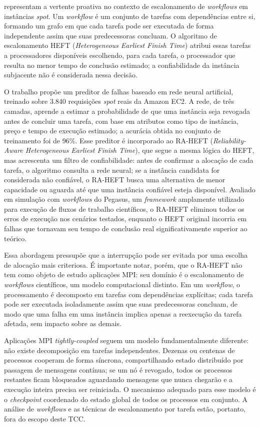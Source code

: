  representam a vertente proativa no
contexto de escalonamento de \textit{workflows} em instâncias \textit{spot}. Um
\textit{workflow} é um conjunto de tarefas com dependências entre si, formando um
grafo em que cada tarefa pode ser executada de forma independente assim que suas
predecessoras concluam. O algoritmo de escalonamento HEFT (\textit{Heterogeneous
Earliest Finish Time}) atribui essas tarefas a processadores disponíveis
escolhendo, para cada tarefa, o processador que resulta no menor tempo de
conclusão estimado; a confiabilidade da instância subjacente não é considerada
nessa decisão.

O trabalho propõe um preditor de falhas baseado em rede neural artificial,
treinado sobre 3.840 requisições \textit{spot} reais da Amazon EC2. A rede, de
três camadas, aprende a estimar a probabilidade de que uma instância seja
revogada antes de concluir uma tarefa, com base em atributos como tipo de
instância, preço e tempo de execução estimado; a acurácia obtida no conjunto de
treinamento foi de 96\%. Esse preditor é incorporado ao RA-HEFT
(\textit{Reliability-Aware Heterogeneous Earliest Finish Time}), que segue a
mesma lógica do HEFT, mas acrescenta um filtro de confiabilidade: antes de
confirmar a alocação de cada tarefa, o algoritmo consulta a rede neural; se a
instância candidata for considerada não confiável, o RA-HEFT busca uma alternativa
de menor capacidade ou aguarda até que uma instância confiável esteja disponível.
Avaliado em simulação com \textit{workflows} do Pegasus, um \textit{framework}
amplamente utilizado para execução de fluxos de trabalho científicos, o RA-HEFT
eliminou todos os erros de execução nos cenários testados, enquanto o HEFT
original incorria em falhas que tornavam seu tempo de conclusão real
significativamente superior ao teórico.

Essa abordagem pressupõe que a interrupção pode ser evitada por uma escolha
de alocação mais criteriosa. É importante notar, porém, que o RA-HEFT não tem
como objeto de estudo aplicações MPI: seu domínio é o escalonamento de
\textit{workflows} científicos, um modelo computacional distinto. Em um
\textit{workflow}, o processamento é decomposto em tarefas com dependências
explícitas; cada tarefa pode ser executada isoladamente assim que suas
predecessoras concluam, de modo que uma falha em uma instância implica apenas
a reexecução da tarefa afetada, sem impacto sobre as demais.

Aplicações MPI \textit{tightly-coupled} seguem um modelo fundamentalmente
diferente: não existe decomposição em tarefas independentes. Dezenas ou
centenas de processos cooperam de forma síncrona, compartilhando estado
distribuído por passagem de mensagens contínua; se um nó é revogado, todos os
processos restantes ficam bloqueados aguardando mensagens que nunca chegarão e
a execução inteira precisa ser reiniciada. O mecanismo adequado para esse
modelo é o \textit{checkpoint} coordenado do estado global de todos os
processos em conjunto. A análise de \textit{workflows} e as técnicas de
escalonamento por tarefa estão, portanto, fora do escopo deste TCC.

